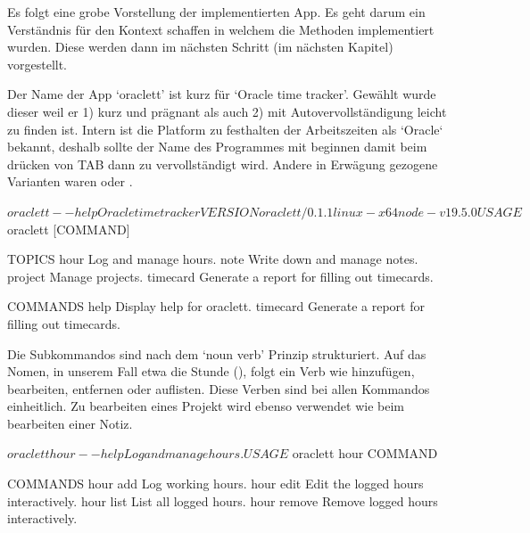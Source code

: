 \documentclass[oneside,bibliography=totocnumbered,BCOR=5mm]{scrbook}
\newenvironment{code}{\captionsetup{type=listing, skip=0pt}}{}
\begin{document}

Es folgt eine grobe Vorstellung der implementierten App. Es geht darum ein
Verständnis für den Kontext schaffen in welchem die Methoden implementiert
wurden. Diese werden dann im nächsten Schritt (im nächsten Kapitel) vorgestellt.

\medskip

Der Name der App `oraclett' ist kurz für `Oracle time tracker'. Gewählt wurde
dieser weil er 1) kurz und prägnant als auch 2) mit Autovervollständigung leicht
zu finden ist. Intern ist die Platform zu festhalten der Arbeitszeiten als
`Oracle` bekannt, deshalb sollte der Name des Programmes mit 
beginnen damit beim drücken von TAB dann zu 
vervollständigt wird. Andere in Erwägung gezogene Varianten waren
 oder .

\begin{code}
  \medskip
  \label{code:oraclett-help}
  \begin{shellcode}
$ oraclett --help
Oracle time tracker

VERSION
  oraclett/0.1.1 linux-x64 node-v19.5.0

USAGE
  $ oraclett [COMMAND]

TOPICS
  hour      Log and manage hours.
  note      Write down and manage notes.
  project   Manage projects.
  timecard  Generate a report for filling out timecards.

COMMANDS
  help      Display help for oraclett.
  timecard  Generate a report for filling out timecards.
  \end{shellcode}
\end{code}

\label{text:noun-verb} Die Subkommandos sind nach dem `noun verb' Prinzip
\parencite{clig} strukturiert. Auf das Nomen, in unserem Fall etwa die Stunde
(), folgt ein Verb wie hinzufügen, bearbeiten, entfernen oder
auflisten. Diese Verben sind bei allen Kommandos einheitlich. Zu bearbeiten
eines Projekt wird ebenso  verwendet wie beim bearbeiten einer
Notiz.

\begin{code}
  \label{code:hours-help}
  \begin{shellcode}
$ oraclett hour --help
Log and manage hours.

USAGE
  $ oraclett hour COMMAND

COMMANDS
  hour add     Log working hours.
  hour edit    Edit the logged hours interactively.
  hour list    List all logged hours.
  hour remove  Remove logged hours interactively.
  \end{shellcode}
  \medskip
\end{code}
\end{document}
